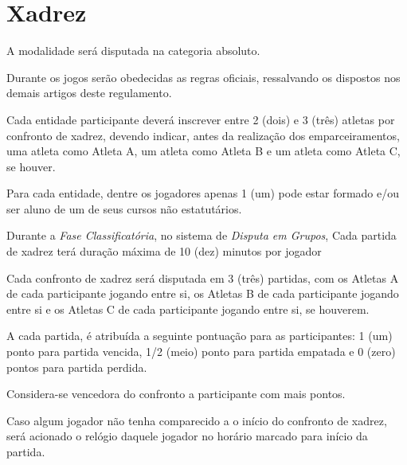 {\let\clearpage\relax \chapter{Xadrez}}

\begin{article}
	A modalidade será disputada na categoria absoluto.
\end{article}

\begin{article}
	Durante os jogos serão obedecidas as regras oficiais, ressalvando os dispostos nos demais artigos deste regulamento.
\end{article}

\begin{article}
	Cada entidade participante deverá inscrever entre 2 (dois) e 3 (três) atletas por confronto de xadrez, devendo indicar, antes da realização dos emparceiramentos, uma atleta como Atleta A, um atleta como Atleta B e um atleta como Atleta C, se houver.
	
	\begin{xparagraph}
	    Para cada entidade, dentre os jogadores apenas 1 (um) pode estar formado e/ou ser aluno de um de seus cursos não estatutários.
	\end{xparagraph}
\end{article}

\begin{article}
	Durante a \textit{Fase Classificatória}, no sistema de \textit{Disputa em Grupos}, Cada partida de xadrez terá duração máxima de 10 (dez) minutos por jogador
\end{article}

\begin{article}
	Cada confronto de xadrez será disputada em 3 (três) partidas, com os Atletas A de cada participante jogando entre si, os Atletas B de cada participante jogando entre si e os Atletas C de cada participante jogando entre si, se houverem.

	\begin{xparagraph}
		A cada partida, é atribuída a seguinte pontuação para as participantes: 1 (um) ponto para partida vencida, 1/2 (meio) ponto para partida empatada e 0 (zero) pontos para partida perdida.
	\end{xparagraph}

	\begin{xparagraph}
		Considera-se vencedora do confronto a participante com mais pontos.
	\end{xparagraph}

	\begin{xparagraph}
		Caso algum jogador não tenha comparecido a o início do confronto de xadrez, será acionado o relógio daquele jogador no horário marcado para início da partida.
	\end{xparagraph}
\end{article}

